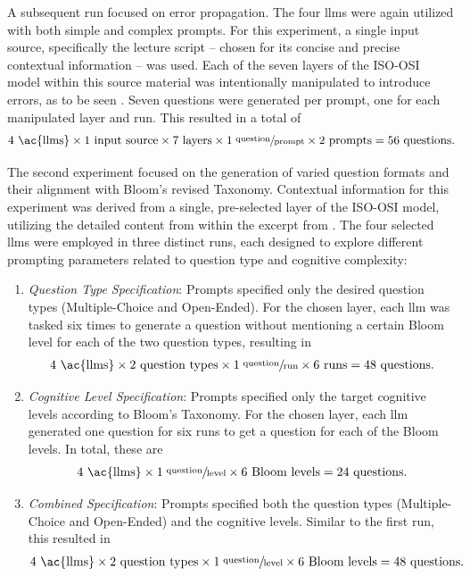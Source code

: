  A subsequent run focused on error propagation. The four \ac{llms} were again utilized with both simple and complex prompts. For this experiment, a single input source, specifically the lecture script -- chosen for its concise and precise contextual information -- was used. Each of the seven layers of the ISO-OSI model within this source material was intentionally manipulated to introduce errors, as to be seen . Seven questions were generated per prompt, one for each manipulated layer and run. This resulted in a total of \begin{align}4 \text{ \ac{llms}} \times 1 \text{ input source} \times 7 \text{ layers} \times 1 \sfrac{\text{ question}}{\text{prompt}} \times 2 \text{ prompts} = 56 \text{ questions.}\end{align}

\pagebreak

 The second experiment focused on the generation of varied question formats and their alignment with Bloom's revised Taxonomy. Contextual information for this experiment was derived from a single, pre-selected layer of the ISO-OSI model, utilizing the detailed content from  within the excerpt from \cite{tanenbaum_computer_2013}. The four selected \ac{llms} were employed in three distinct runs, each designed to explore different prompting parameters related to question type and cognitive complexity:

\begin{enumerate}
    \item \textit{Question Type Specification}: Prompts specified only the desired question types (Multiple-Choice and Open-Ended). For the chosen layer, each \ac{llm} was tasked six times to generate a question without mentioning a certain Bloom level for each of the two question types, resulting in \begin{align}4 \text{ \ac{llms}} \times 2 \text{ question types} \times 1 \sfrac{\text{ question}}{\text{run}}\times 6 \text{ runs} = 48 \text{ questions.}\end{align}
    \item \textit{Cognitive Level Specification}: Prompts specified only the target cognitive levels according to Bloom's Taxonomy. For the chosen layer, each \ac{llm} generated one question for six runs to get a question for each of the Bloom levels. In total, these are  \begin{align}4 \text{ \ac{llms}} \times 1 \sfrac{\text{ question}}{\text{level}} \times 6 \text{ Bloom levels} = 24 \text{ questions.}\end{align}
    \item \textit{Combined Specification}: Prompts specified both the question types (Multiple-Choice and Open-Ended) and the cognitive levels. Similar to the first run, this resulted in \begin{align}4 \text{ \ac{llms}} \times 2 \text{ question types} \times 1 \sfrac{\text{ question}}{\text{level}} \times 6 \text{ Bloom levels} = 48 \text{ questions.}\end{align}
\end{enumerate}

